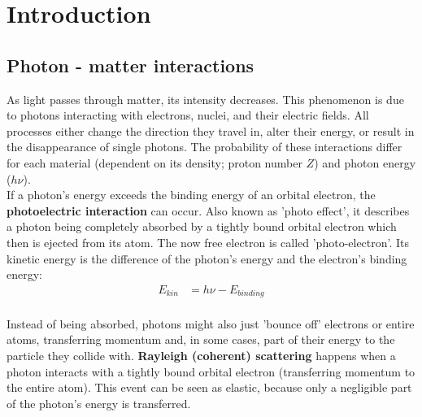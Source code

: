 
\chapter{Introduction}
\label{chap:intro}

\section{Photon - matter interactions}
\label{sec:photon}

As light passes through matter, its intensity decreases.
This phenomenon is due to photons interacting with electrons, nuclei, and their electric fields.
All processes either change the direction they travel in, alter their energy, or result in the disappearance of single photons.
The probability of these interactions differ for each material (dependent on its density; proton number $Z$) and photon energy ($h\nu$). \\

If a photon's energy exceeds the binding energy of an orbital electron, the \textbf{photoelectric interaction} can occur.
Also known as 'photo effect', it describes a photon being completely absorbed by a tightly bound orbital electron which then is ejected from its atom.
The now free electron is called 'photo-electron'. Its kinetic energy is the difference of the photon's energy and the electron's binding energy:
\begin{align}
E_{kin} &= h\nu - E_{binding}
\end{align} \\

Instead of being absorbed, photons might also just 'bounce off' electrons or entire atoms, transferring momentum and, in some cases, part of their energy to the particle they collide with.
\textbf{Rayleigh (coherent) scattering} happens when a photon interacts with a tightly bound orbital electron (transferring momentum to the entire atom).
This event can be seen as elastic, because only a negligible part of the photon's energy is transferred.

